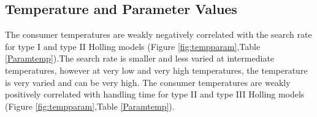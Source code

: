 \documentclass{article}
\begin{document}
\subsection{Temperature and Parameter Values}
The consumer temperatures are  weakly negatively correlated with the search rate for type I and type II Holling models (Figure \ref{fig:tempparam},Table \ref{Paramtemp}).The search rate is smaller and less varied at intermediate temperatures, however at very low and very high temperatures, the temperature is very varied and can be very high. The consumer temperatures are weakly positively correlated with handling time for type II and type III Holling models (Figure \ref{fig:tempparam},Table \ref{Paramtemp}).

\begin{figure}[h!t]
\centering
{}\\
 \\

\end{figure}
\end{document}
